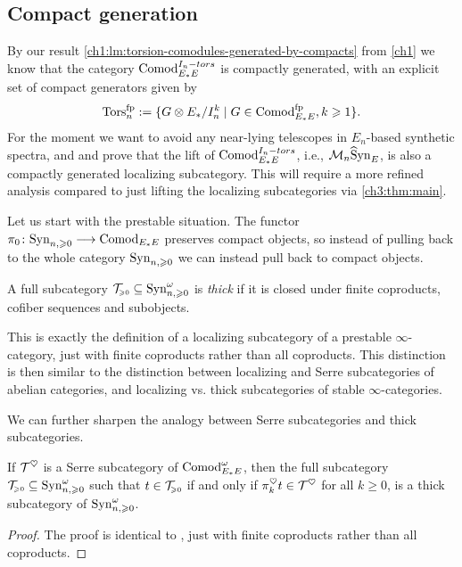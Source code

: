 \subsection{Compact generation}

By our result \cref{ch1:lm:torsion-comodules-generated-by-compacts} from \cref{ch1} we know that the category $\mathrm{Comod}_{E_*E}^{I_n-tors}$ is compactly generated, with an explicit set of compact generators given by 
\[\mathrm{Tors}_n^{\mathrm{fp}} := \{G\otimes E_*/I_n^k \mid G\in \mathrm{Comod}_{E_*E}^{\mathrm{fp}}, k\geqslant 1\}.\]
For the moment we want to avoid any near-lying telescopes in $E_n$-based synthetic spectra, and and prove that the lift of $\mathrm{Comod}_{E_*E}^{I_n-tors}$, i.e., $\mathcal{M}_{n}\widehat{\mathrm{S}}\mathrm{yn}_{E}$, is also a compactly generated localizing subcategory. This will require a more refined analysis compared to just lifting the localizing subcategories via \cref{ch3:thm:main}. 

Let us start with the prestable situation. The functor $\pi_0 \colon \mathrm{Syn}_{n, \geqslant 0} \longrightarrow \mathrm{Comod}_{E_*E}$ preserves compact objects, so instead of pulling back to the whole category $\mathrm{Syn}_{n, \geqslant 0}$ we can instead pull back to compact objects. 

\begin{definition}
    A full subcategory $\mathcal{T}_{\hspace{-1pt}\scriptscriptstyle\geqslant 0} \subseteq \mathrm{Syn}_{n, \geqslant 0}^\omega$ is \emph{thick} if it is closed under finite coproducts, cofiber sequences and subobjects. 
\end{definition}

\begin{remark}
    This is exactly the definition of a localizing subcategory of a prestable $\infty$-category, just with finite coproducts rather than all coproducts. This distinction is then similar to the distinction between localizing and Serre subcategories of abelian categories, and localizing vs. thick subcategories of stable $\infty$-categories. 
\end{remark}

We can further sharpen the analogy between Serre subcategories and thick subcategories. 

\begin{lemma}
    If $\mathcal{T}^\heartsuit$ is a Serre subcategory of $\mathrm{Comod}_{E_*E}^\omega$, then the full subcategory $\mathcal{T}_{\hspace{-1pt}\scriptscriptstyle\geqslant 0}\subseteq \mathrm{Syn}_{n, \geqslant 0}^\omega$ such that $t\in \mathcal{T}_{\hspace{-1pt}\scriptscriptstyle\geqslant 0}$ if and only if $\pi^\heartsuit_k t \in \mathcal{T}^\heartsuit$ for all $k\geq 0$, is a thick subcategory of $\mathrm{Syn}_{n, \geqslant 0}^\omega$. 
\end{lemma}
\begin{proof}
    The proof is identical to \cite[C.5.2.7]{lurie_SAG}, just with finite coproducts rather than all coproducts. 
\end{proof}

